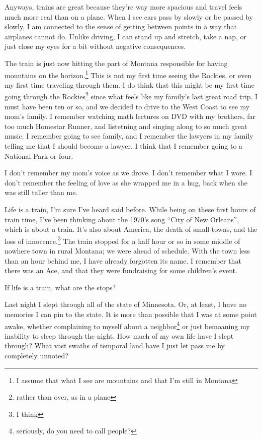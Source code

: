 \documentclass[12pt]{article}
\newcommand{\say}[1]{``#1''}
\renewcommand{\,}{\textsuperscript{,}}
\begin{document}
Anyways, trains are great because they're way more spacious and travel feels much more real than on a plane.
When I see cars pass by slowly or be passed by slowly, I am connected to the sense of getting between points in a way that airplanes cannot do.
Unlike driving, I can stand up and stretch, take a nap, or just close my eyes for a bit without negative consequences.

The train is just now hitting the part of Montana responsible for having mountains on the horizon.\footnote{I assume that what I see are mountains and that I'm still in Montana}
This is not my first time seeing the Rockies, or even my first time traveling through them.
I do think that this might be my first time going through the Rockies\footnote{rather than over, as in a plane} since what feels like my family's last great road trip.
I must have been ten or so, and we decided to drive to the West Coast to see my mom's family.
I remember watching math lectures on DVD with my brothers, far too much Homestar Runner, and listetning and singing along to so much great music.
I remember going to see family, and I remember the lawyers in my family telling me that I should become a lawyer.
I think that I remember going to a National Park or four.

I don't remember my mom's voice as we drove.
I don't remember what I wore.
I don't remember the feeling of love as she wrapped me in a hug, back when she was still taller than me.

Life is a train, I'm sure I've heard said before.
While being on these first hours of train time, I've been thinking about the 1970's song \say{City of New Orleans}, which is about a train.
It's also about America, the death of small towns, and the loss of innocence.\footnote{I think}
The train stopped for a half hour or so in some middle of nowhere town in rural Montana; we were ahead of schedule.
With the town less than an hour behind me, I have already forgotten its name.
I remember that there was an Ace, and that they were fundraising for some children's event.

If life is a train, what are the stops?

Last night I slept through all of the state of Minnesota.
Or, at least, I have no memories I can pin to the state.
It is more than possible that I was at some point awake, whether complaining to myself about a neighbor\footnote{seriously, do you need to call people?} or just bemoaning my inability to sleep through the night.
How much of my own life have I slept through?
What vast swaths of temporal land have I just let pass me by completely unnoted?
\end{document}
